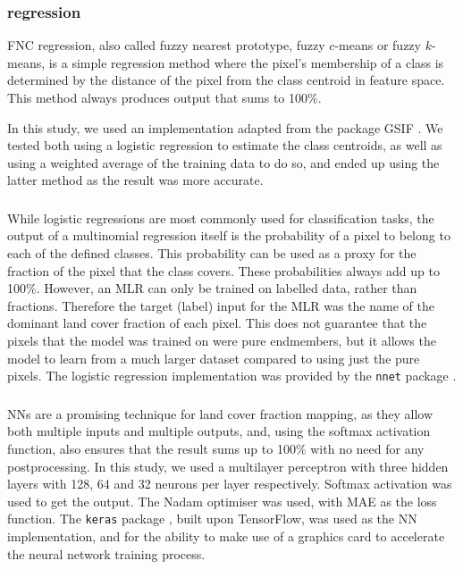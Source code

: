 \documentclass[a4paper,10pt]{article}
\begin{document}
\subsubsection{ regression}

\Gls{FNC} regression, also called fuzzy nearest prototype, fuzzy $c$-means or fuzzy $k$-means, is a simple regression method where the pixel's membership of a class is determined by the distance of the pixel from the class centroid in feature space.
This method always produces output that sums to 100\%.

In this study, we used an implementation adapted from the package GSIF \citep{hengl2004fuzzycmeans}.
We tested both using a logistic regression to estimate the class centroids, as well as using a weighted average of the training data to do so, and ended up using the latter method as the result was more accurate.

\subsubsection{}

While logistic regressions are most commonly used for classification tasks, the output of a multinomial regression itself is the probability of a pixel to belong to each of the defined classes.
This probability can be used as a proxy for the fraction of the pixel that the class covers.
These probabilities always add up to 100\%.
However, an \ac{MLR} can only be trained on labelled data, rather than fractions.
Therefore the target (label) input for the \ac{MLR} was the name of the dominant land cover fraction of each pixel.
This does not guarantee that the pixels that the model was trained on were pure endmembers, but it allows the model to learn from a much larger dataset compared to using just the pure pixels.
The logistic regression implementation was provided by the \texttt{nnet} package \citep{nnet}.

\subsubsection{}

\Glspl{NN} are a promising technique for land cover fraction mapping, as they allow both multiple inputs and multiple outputs, and, using the softmax activation function, also ensures that the result sums up to 100\% with no need for any postprocessing.
In this study, we used a multilayer perceptron with three hidden layers with 128, 64 and 32 neurons per layer respectively.
Softmax activation was used to get the output.
The Nadam optimiser \citep{dozat_incorporating_2016} was used, with \gls{MAE} as the loss function.
The \texttt{keras} package \citep{keras}, built upon TensorFlow, was used as the \ac{NN} implementation, and for the ability to make use of a graphics card to accelerate the neural network training process.
\end{document}
